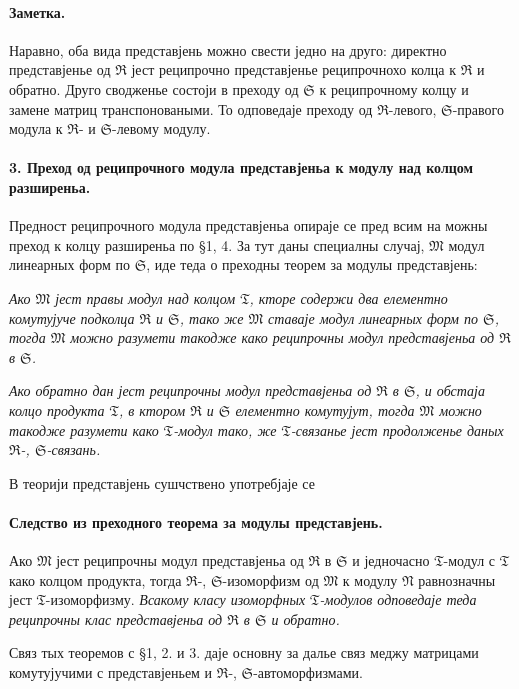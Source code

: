 ﻿\documentclass[11pt]{article}
\providecommand{\frM}{\mathfrak M}
\providecommand{\frN}{\mathfrak N}
\providecommand{\frR}{\mathfrak R}
\providecommand{\frS}{\mathfrak S}
\providecommand{\frT}{\mathfrak T}
\begin{document}
\paragraph{Заметка.}
Наравно, оба вида представјень можно свести једно на друго: директно представјенье од \(\frR\) јест реципрочно представјенье реципрочнохо колца к \(\frR\) и обратно. Друго сводженье состоји в преходу од \(\frS\) к реципрочному колцу и замене матриц транспоноваными. То одповедаје преходу од \(\frR\)-левого, \(\frS\)-правого модула к \(\frR\)- и \(\frS\)-левому модулу.

\paragraph{3. Преход од реципрочного модула представјеньа к модулу над колцом разширеньа.}
Предност реципрочного модула представјеньа опираје се пред всим на можны преход к колцу разширеньа по §1, 4. За тут даны специалны случај, \(\frM\) модул линеарных форм по \(\frS\), иде теда о преходны теорем за модулы представјень:

\emph{Ако \(\frM\) јест правы модул над колцом \(\frT\), кторе содержи два елементно комутујуче подколца \(\frR\) и \(\frS\), тако же \(\frM\) ставаје модул линеарных форм по \(\frS\), тогда \(\frM\) можно разумети такодже како реципрочны модул представјеньа од \(\frR\) в \(\frS\).}

\emph{Ако обратно дан јест реципрочны модул представјеньа од \(\frR\) в \(\frS\), и обстаја колцо продукта \(\frT\), в ктором \(\frR\) и \(\frS\) елементно комутујут, тогда \(\frM\) можно такодже разумети како \(\frT\)-модул тако, же \(\frT\)-связанье јест продолженье даных \(\frR\)-, \(\frS\)-связань.}

В теорији представјень сушчствено употребјаје се

\paragraph{Следство из преходного теорема за модулы представјень.}
Ако \(\frM\) јест реципрочны модул представјеньа од \(\frR\) в \(\frS\) и једночасно \(\frT\)-модул с \(\frT\) како колцом продукта, тогда \(\frR\)-, \(\frS\)-изоморфизм од \(\frM\) к модулу \(\frN\) равнозначны јест \(\frT\)-изоморфизму. \emph{Всакому класу изоморфных \(\frT\)-модулов одповедаје теда реципрочны клас представјеньа од \(\frR\) в \(\frS\) и обратно.}

Связ тых теоремов с §1, 2. и 3. даје основну за далье связ меджу матрицами комутујучими с представјеньем и \(\frR\)-, \(\frS\)-автоморфизмами.
\end{document}

